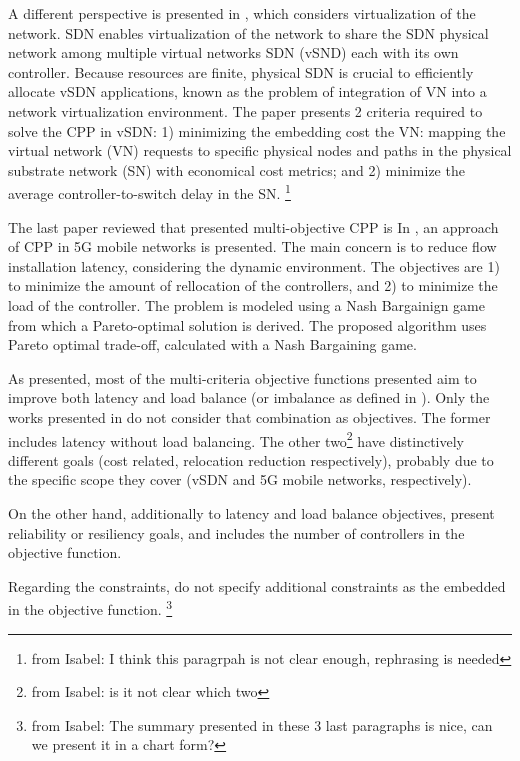 \documentclass{IEEEtran}
\newcommand\fia[1]{{\color{red}\footnote{\color{red}from Isabel: #1}}} %
\newcommand\mia[1]{{\color{red}#1}}%
\newcommand\delia[1]{{\tiny{\color{red}#1}}} %
\begin{document}
A different perspective is presented in \cite{GoGi17}, which considers virtualization of the network. SDN enables virtualization of the network to share the SDN physical network among multiple virtual networks SDN (vSND) each with its own controller. Because resources are finite, physical SDN is crucial to efficiently allocate vSDN applications, known as the problem of integration of VN into a network virtualization environment. The paper presents 2 criteria required to solve the CPP in vSDN: 1) minimizing the embedding cost the VN: mapping the virtual network (VN) requests to specific physical nodes and paths in the physical substrate network (SN) with economical cost metrics; and 2) minimize the average controller-to-switch delay in the SN. \fia{I think this paragrpah is not clear enough, rephrasing is needed}

\delia{The last paper reviewed that presented multi-objective CPP is} \mia{In} \cite{KsBa16b}, an approach of CPP in 5G mobile networks \mia{is presented}. The main concern is to reduce flow installation latency, considering the dynamic environment. The objectives are 1) to minimize the amount of rellocation of the controllers, and 2) to minimize the load of the controller. \mia{The problem is modeled using a Nash Bargainign game from which a Pareto-optimal solution is derived}. \delia{The proposed algorithm uses Pareto optimal trade-off, calculated  with a Nash Bargaining game.}

As presented, most of the multi-criteria objective functions presented aim to improve both latency and \mia{load} balance (or imbalance as defined in \cite{LaGeb15}). Only the works presented in \cite{ZhGi17,GoGi17,KsBa16b} do not consider that combination as objectives. The former includes latency without load balancing. The other two\fia{is it not clear which two} have distinctively different goals (cost related, relocation reduction respectively), probably due to the specific scope they cover (vSDN and 5G mobile networks, respectively).

On the other hand, additionally to latency and \mia{load} balance objectives, \cite{VoBo15, LaGe15, HoHa13, VaMo18} present reliability or resiliency goals, and \cite{PeRe16} includes the number of controllers in the objective function.

Regarding the constraints, \cite{AhJa15,LaGe15, HoHa13} do not specify additional constraints as the embedded in the objective function. \fia{The summary presented in these 3 last paragraphs is nice, can we present it in a chart form?}
\end{document}
